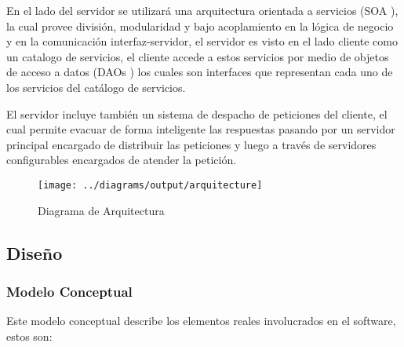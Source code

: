 En el lado del servidor se utilizará una arquitectura orientada a servicios (SOA \cite{soa}), la cual provee división, modularidad y bajo acoplamiento en la lógica de negocio y en la comunicación interfaz-servidor, el servidor es visto en el lado cliente como un catalogo de servicios, el cliente accede a estos servicios por medio de objetos de acceso a datos (DAOs \cite{dao} ) los cuales son interfaces que representan cada uno de los servicios del catálogo de servicios.

El servidor incluye también un sistema de despacho de peticiones del cliente, el cual permite evacuar de forma inteligente las respuestas pasando por un servidor principal encargado de distribuir las peticiones y luego a través de servidores configurables encargados de atender la petición.

\begin{landscape}
\begin{figure}
 \centering
 \texttt{[image: ../diagrams/output/arquitecture]}
 \caption{Diagrama de Arquitectura}
 \label{diagrama:arquitectura}
\end{figure}
\end{landscape}


\subsection{Diseño}

\subsubsection{Modelo Conceptual}

Este modelo conceptual describe los elementos reales involucrados en el software, estos son:

